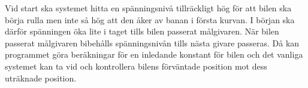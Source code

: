 Vid start ska systemet hitta en spänningsnivå tillräckligt hög för att bilen ska
börja rulla men inte så hög att den åker av banan i första kurvan. I början ska
därför spänningen öka lite i taget tills bilen passerat målgivaren. När bilen
passerat målgivaren bibehålls spänningsnivån tills nästa givare passeras.
Då kan programmet göra beräkningar för en inledande konstant för bilen och
det vanliga systemet kan ta vid och kontrollera bilens förväntade position mot
dess uträknade position.
